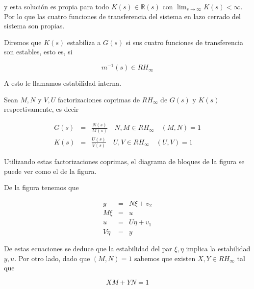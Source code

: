         y esta solución es propia para todo $K(s) \in \mathbb{R}(s)$ con $\lim_{s \to \infty} K(s) < \infty$.
        Por lo que las cuatro funciones de transferencia del sistema en lazo cerrado del sistema son propias.

        Diremos que $K(s)$ estabiliza a $G(s)$ si sus cuatro funciones de transferencia son estables, esto es, si

        \begin{equation*}
            m^{-1}(s) \in RH_{\infty}
        \end{equation*}

        A esto le llamamos estabilidad interna.

        Sean $M, N$ y $V, U$ factorizaciones coprimas de $RH_\infty$ de $G(s)$ y $K(s)$ respectivamente, es decir

        \begin{eqnarray}
            G(s) & = & \frac{N(s)}{M(s)} \quad N, M \in RH_{\infty} \quad (M, N) = 1 \\
            K(s) & = & \frac{U(s)}{V(s)} \quad U, V \in RH_{\infty} \quad (U, V) = 1
        \end{eqnarray}

        Utilizando estas factorizaciones coprimas, el diagrama de bloques de la figura se puede ver como el de la figura.


        De la figura tenemos que

        \begin{eqnarray} \label{eq:robus1}
            y & = & N \xi + v_2 \nonumber \\
            M \xi & = & u \nonumber \\
            u & = & U \eta + v_1 \nonumber \\
            V \eta & = & y
        \end{eqnarray}

        De estas ecuaciones se deduce que la estabilidad del par $\xi, \eta$ implica la estabilidad $y, u$.
        Por otro lado, dado que $(M, N) = 1$ sabemos que existen $X, Y \in RH_{\infty}$ tal que

        \begin{equation}
            X M + Y N = 1
        \end{equation}

